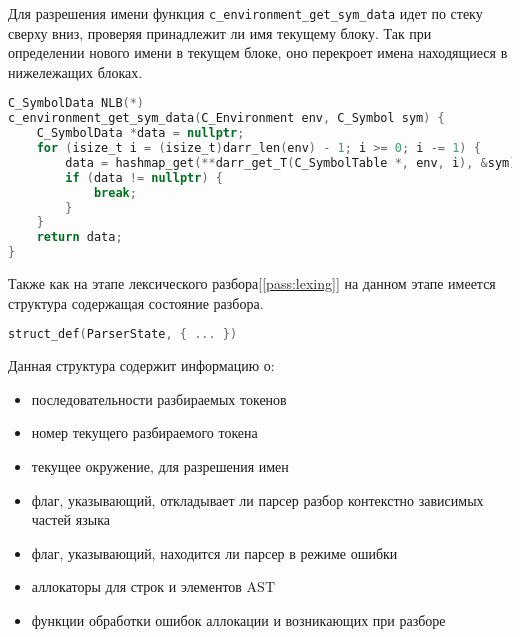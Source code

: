 Для разрешения имени функция \verb|c_environment_get_sym_data| идет по стеку сверху вниз, проверяя принадлежит ли имя текущему блоку.
Так при определении нового имени в текущем блоке, оно перекроет имена находящиеся в нижележащих блоках. 

\begin{lstlisting}[language=c, caption={Определение функции разрешения имени символа}, label={parsing:get-sym-data-def}]
C_SymbolData NLB(*)
c_environment_get_sym_data(C_Environment env, C_Symbol sym) {
    C_SymbolData *data = nullptr;
    for (isize_t i = (isize_t)darr_len(env) - 1; i >= 0; i -= 1) {
        data = hashmap_get(**darr_get_T(C_SymbolTable *, env, i), &sym);
        if (data != nullptr) {
            break;
        }
    }
    return data;
}
\end{lstlisting}



Также как на этапе лексического разбора[\ref{pass:lexing}] на данном этапе имеется структура содержащая состояние разбора.

\begin{lstlisting}[language=c]
struct_def(ParserState, { ... })
\end{lstlisting}

Данная структура содержит информацию о:
\begin{itemize}
    \item последовательности разбираемых токенов
    \item номер текущего разбираемого токена
    \item текущее окружение, для разрешения имен
    \item флаг, указывающий, откладывает ли парсер разбор контекстно зависимых частей языка
    \item флаг, указывающий, находится ли парсер в режиме ошибки
    \item аллокаторы для строк и элементов AST
    \item функции обработки ошибок аллокации и возникающих при разборе
\end{itemize}





